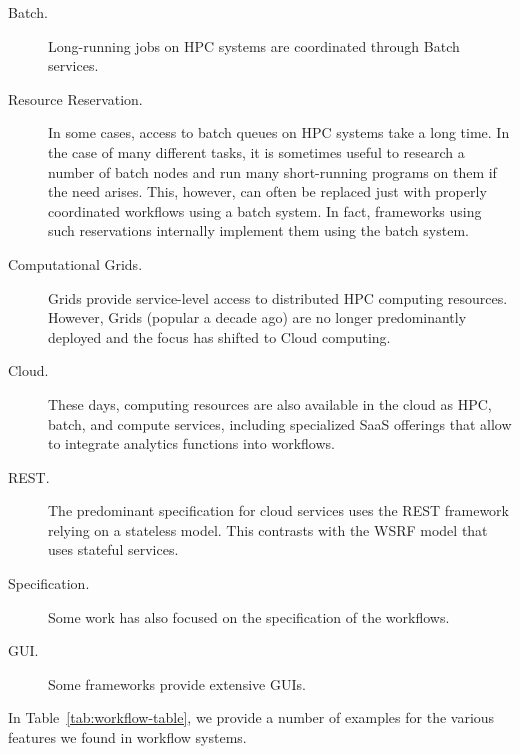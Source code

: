 \begin{description}

\item[Batch.] Long-running jobs on HPC systems are coordinated through
Batch services.

\item[Resource Reservation.] In some cases, access to batch queues on
HPC systems take a long time. In the case of many different tasks, it
is sometimes useful to research a number of batch nodes and run many
short-running programs on them if the need arises. This, however, can
often be replaced just with properly coordinated workflows using a
batch system. In fact, frameworks using such reservations internally
implement them using the batch system.

\item[Computational Grids.] Grids provide service-level access to
distributed HPC computing resources. However, Grids (popular a decade
ago) are no longer predominantly deployed and the focus has shifted to
Cloud computing.

\item[Cloud.] These days, computing resources are also available in
the cloud as HPC, batch, and compute services, including specialized
SaaS offerings that allow to integrate analytics functions into
workflows.

\item[REST.] The predominant specification for cloud services uses the
REST framework relying on a stateless model. This contrasts with the
WSRF model that uses stateful services.

\item[Specification.] Some work has also focused on the specification
of the workflows.

\item[GUI.] Some frameworks provide extensive GUIs.


\end{description}

In Table~\ref{tab:workflow-table}, we provide a number of examples for
the various features we found in workflow systems.


